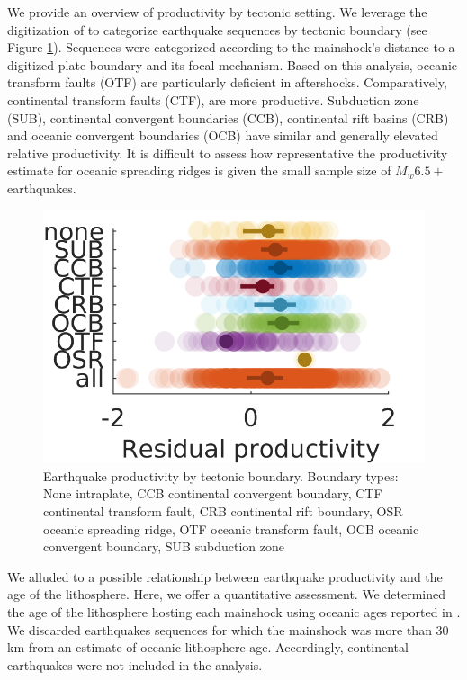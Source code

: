 \documentclass[12pt, notitlepage]{report}
\begin{document}
We provide an overview of productivity by tectonic setting. We leverage the digitization of \textcite{Bird2003AnBoundaries} to categorize earthquake sequences by tectonic boundary (see Figure \ref{fig:plate_boundary}). Sequences were categorized according to the mainshock's distance to a digitized plate boundary and its focal mechanism. Based on this analysis, oceanic transform faults (OTF) are particularly deficient in aftershocks. Comparatively, continental transform faults (CTF), are more productive. Subduction zone (SUB), continental convergent boundaries (CCB), continental rift basins (CRB) and oceanic convergent boundaries (OCB) have similar and generally elevated relative productivity. It is difficult to assess how representative the productivity estimate for oceanic spreading ridges is given the small sample size of $M_w 6.5+$ earthquakes.

\begin{figure}
    \centering
    \includegraphics{figures/prod_by_plate_boundary.png}
    \caption{Earthquake productivity by tectonic boundary. Boundary types: None intraplate, CCB continental convergent boundary, CTF continental transform fault, CRB continental rift boundary, OSR oceanic spreading ridge, OTF oceanic transform fault, OCB oceanic convergent boundary, SUB subduction zone}
    \label{fig:plate_boundary}
\end{figure}

We alluded to a possible relationship between earthquake productivity and the age of the lithosphere. Here, we offer a quantitative assessment. We determined the age of the lithosphere hosting each mainshock using oceanic ages reported in \textcite{Muller2008}. We discarded earthquakes sequences for which the mainshock was more than 30 km from an estimate of oceanic lithosphere age. Accordingly, continental earthquakes were not included in the analysis. 
\end{document}
